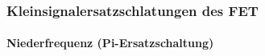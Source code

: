

\subsubsection{Kleinsignalersatzschlatungen des FET}

\paragraph{Niederfrequenz (Pi-Ersatzschaltung)}
\label{Niederfrequenz (Pi-Ersatzschaltung)}

